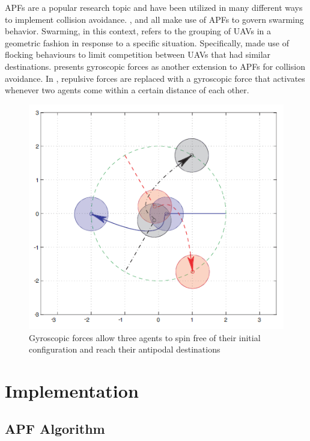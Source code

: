 \documentclass[conference]{IEEEtran}
\begin{document}
APFs are a popular research topic and have been utilized in many different ways to implement collision avoidance.   \cite{ruchti2011uav}, \cite{balch2000social} and \cite{barnes2006swarm} all make use of APFs to govern swarming behavior.  Swarming, in this context, refers to the grouping of UAVs in a geometric fashion in response to a specific situation. Specifically,  \cite{ruchti2011uav} made use of flocking behaviours to limit competition between UAVs that had similar destinations.  \cite{chang2003collision} presents gyroscopic forces as another extension to APFs for collision avoidance.  In \cite{chang2003collision}, repulsive forces are replaced with a gyroscopic force that activates whenever two agents come within a certain distance of each other.

\begin{figure}
	\includegraphics [width=1\columnwidth] {2003Chang}
	\caption{Gyroscopic forces allow three agents to spin free of their initial configuration and reach their antipodal destinations \cite{chang2003collision}}
	\label{fig:2003Chang}
\end{figure}

\section{Implementation}
\label{sec:implementation}

\subsection{APF Algorithm}
\end{document}
